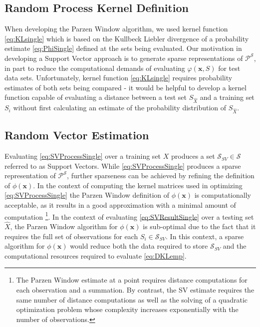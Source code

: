 \documentclass[10pt]{article}
\begin{document}
\subsection{  Random Process Kernel Definition }

When developing the Parzen Window algorithm, we used kernel function \ref{eq:KLsingle} which is based on the Kullbeck Liebler divergence of a probability estimate \ref{eq:PhiSingle} defined at the sets being evaluated.  Our motivation in developing a Support Vector approach is to generate sparse representations of \( \mathcal{P}^{\mathcal{S}} \), in part to reduce the computational demands of evaluating \( \varphi( \mathbf{x}, S) \) for test data sets.  Unfortunately, kernel function \ref{eq:KLsingle} requires probability estimates of both sets being compared - it would be helpful to develop a kernel function capable of evaluating a distance between a test set \( S_{\hat{X}} \) and a training set \( S_i \) without first calculating an estimate of the probability distribution of \( S_{\hat{X}} \).


\subsection{ Random Vector Estimation }
 
Evaluating \ref{eq:SVProcessSingle} over a training set \( X \) produces a set \( \mathcal{S}_{SV} \in \mathcal{S} \) referred to as Support Vectors.  While \ref{eq:SVProcessSingle} produces a sparse representation of \( \mathcal{P}^\mathcal{S} \), further sparseness can be achieved by refining the definition of \( \phi(\mathbf{x}) \).  In the context of computing the kernel matrices used in optimizing \ref{eq:SVProcessSingle} the Parzen Window definition of \( \phi(\mathbf{x}) \) is computationally acceptable, as it results in a good approximation with a minimal amount of computation \footnote{ The Parzen Window estimate at a point requires distance computations for each observation and a summation.  By contrast, the SV estimate requires the same number of distance computations as well as the solving of a quadratic optimization problem whose complexity increases exponentially with the number of observations. }.  In the context of evaluating \ref{eq:SVResultSingle} over a testing set \( \hat{X} \), the Parzen Window algorithm for \( \phi(\mathbf{x}) \) is sub-optimal due to the fact that it requires the full set of observations for each \( S_i \in \mathcal{S}_{SV} \).  In this context, a sparse algorithm for \( \phi(\mathbf{x}) \) would reduce both the data required to store \( \mathcal{S}_{SV} \) and the computational resources required to evaluate \ref{eq:DKLemp}.
\end{document}
